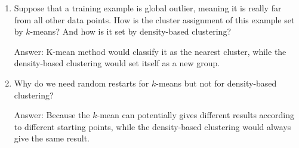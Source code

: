 \documentclass{article}
\newenvironment{answer}{\par\begingroup\color{gre}Answer: }{\endgroup}
\begin{document}
\begin{enumerate}
\item Suppose that a training example is global outlier, meaning it is really far from all other data points. How is the cluster assignment of this example set by $k$-means? And how is it set by density-based clustering?
\begin{answer}
	K-mean method would classify it as the nearest cluster, while the density-based clustering would set itself as a new group.
\end{answer}
%
\item Why do we need random restarts for $k$-means but not for density-based clustering?
\begin{answer}
	Because the $k$-mean can potentially gives different results according to different starting points, while the density-based clustering would always give the same result.


\end{answer}
\end{enumerate}
\end{document}
